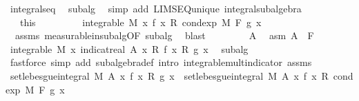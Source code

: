 \begin{isabellebody}
\ integral{\isacharunderscore}{\kern0pt}s{\isacharunderscore}{\kern0pt}eq\ \isamarkupfalse%
\ subalg\ \isamarkupfalse%
\ {\isacharparenleft}{\kern0pt}simp\ add{\isacharcolon}{\kern0pt}\ LIMSEQ{\isacharunderscore}{\kern0pt}unique\ integral{\isacharunderscore}{\kern0pt}subalgebra{}{\isacharparenright}{\kern0pt}\isanewline
\ \ \ \ \isamarkupfalse%
\isanewline
\ \ \isacommand{{\isacharbraceright}{\kern0pt}}\isamarkupfalse%
\isanewline
\ \ \isamarkupfalse%
\ {\isacharasterisk}{\kern0pt}\ {\isacharequal}{\kern0pt}\ this\isanewline
\isanewline
\ \ \isanewline
\ \ \isanewline
\ \ \isamarkupfalse%
\ {\isachardoublequoteopen}integrable\ M\ {\isacharparenleft}{\kern0pt}{\isasymlambda}x{\isachardot}{\kern0pt}\ f\ x\ {\isacharasterisk}{\kern0pt}\isactrlsub R\ cond{\isacharunderscore}{\kern0pt}exp\ M\ F\ g\ x{\isacharparenright}{\kern0pt}{\isachardoublequoteclose}\ \isamarkupfalse%
\ {\isacharasterisk}{\kern0pt}\ assms\ measurable{\isacharunderscore}{\kern0pt}in{\isacharunderscore}{\kern0pt}subalg{\isacharbrackleft}{\kern0pt}OF\ subalg{\isacharbrackright}{\kern0pt}\ \isamarkupfalse%
\ blast\isanewline
\isanewline
\ \ \isacommand{{\isacharbraceleft}{\kern0pt}}\isamarkupfalse%
\isanewline
\ \ \ \ \isamarkupfalse%
\ A\ \isamarkupfalse%
\ asm{\isacharcolon}{\kern0pt}\ {\isachardoublequoteopen}A\ {\isasymin}\ F{\isachardoublequoteclose}\isanewline
\ \ \ \ \isamarkupfalse%
\ {\isachardoublequoteopen}integrable\ M\ {\isacharparenleft}{\kern0pt}{\isasymlambda}x{\isachardot}{\kern0pt}\ indicat{\isacharunderscore}{\kern0pt}real\ A\ x\ {\isacharasterisk}{\kern0pt}\isactrlsub R\ f\ x\ {\isacharasterisk}{\kern0pt}\isactrlsub R\ g\ x{\isacharparenright}{\kern0pt}{\isachardoublequoteclose}\ \isamarkupfalse%
\ subalg\ \isamarkupfalse%
\ {\isacharparenleft}{\kern0pt}fastforce\ simp\ add{\isacharcolon}{\kern0pt}\ subalgebra{\isacharunderscore}{\kern0pt}def\ intro{\isacharbang}{\kern0pt}{\isacharcolon}{\kern0pt}\ integrable{\isacharunderscore}{\kern0pt}mult{\isacharunderscore}{\kern0pt}indicator\ assms{\isacharparenleft}{\kern0pt}{}{\isacharparenright}{\kern0pt}{\isacharparenright}{\kern0pt}\isanewline
\ \ \ \ \isamarkupfalse%
\ {\isachardoublequoteopen}set{\isacharunderscore}{\kern0pt}lebesgue{\isacharunderscore}{\kern0pt}integral\ M\ A\ {\isacharparenleft}{\kern0pt}{\isasymlambda}x{\isachardot}{\kern0pt}\ f\ x\ {\isacharasterisk}{\kern0pt}\isactrlsub R\ g\ x{\isacharparenright}{\kern0pt}\ {\isacharequal}{\kern0pt}\ set{\isacharunderscore}{\kern0pt}lebesgue{\isacharunderscore}{\kern0pt}integral\ M\ A\ {\isacharparenleft}{\kern0pt}{\isasymlambda}x{\isachardot}{\kern0pt}\ f\ x\ {\isacharasterisk}{\kern0pt}\isactrlsub R\ cond{\isacharunderscore}{\kern0pt}exp\ M\ F\ g\ x{\isacharparenright}{\kern0pt}{\isachardoublequoteclose}\ \isamarkupfalse%

\end{isabellebody}
